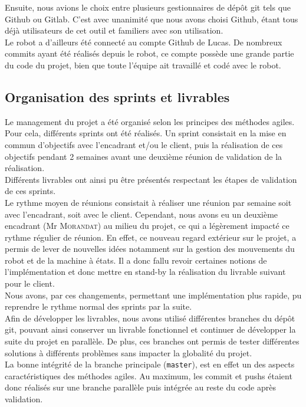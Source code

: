 \documentclass[a4paper,french]{article}
\begin{document}
Ensuite, nous avions le choix entre plusieurs gestionnaires de dépôt git tels que Github ou Gitlab. C'est avec unanimité que nous avons choisi Github, étant tous déjà utilisateurs de cet outil et familiers avec son utilisation. \\

Le robot a d'ailleurs été connecté au compte Github de Lucas. De nombreux commits ayant été réalisés depuis le robot, ce compte possède une grande partie du code du projet, bien que toute l'équipe ait travaillé et codé avec le robot.

\subsection{Organisation des sprints et livrables}
Le management du projet a été organisé selon les principes des méthodes agiles. Pour cela, différents sprints ont été réalisés. Un sprint consistait en la mise en commun d'objectifs avec l'encadrant et/ou le client, puis la réalisation de ces objectifs pendant 2 semaines avant une deuxième réunion de validation de la réalisation. \\
Différents livrables ont ainsi pu être présentés respectant les étapes de validation de ces sprints. \\

Le rythme moyen de réunions consistait à réaliser une réunion par semaine soit avec l'encadrant, soit avec le client. Cependant, nous avons eu un deuxième encadrant (Mr \textsc{Morandat}) au milieu du projet, ce qui a légèrement impacté ce rythme régulier de réunion. En effet, ce nouveau regard extérieur sur le projet, a permis de lever de nouvelles idées notamment sur la gestion des mouvements du robot et de la machine à états. Il a donc fallu revoir certaines notions de l'implémentation et donc mettre en stand-by la réalisation du livrable suivant pour le client. \\

Nous avons, par ces changements, permettant une implémentation plus rapide, pu reprendre le rythme normal des sprints par la suite. \\

Afin de développer les livrables, nous avons utilisé différentes branches du dépôt git, pouvant ainsi conserver un livrable fonctionnel et continuer de développer la suite du projet en parallèle. De plus, ces branches ont permis de tester différentes solutions à différents problèmes sans impacter la globalité du projet. \\ La bonne intégrité de la branche principale (\texttt{master}), est en effet un des aspects caractéristiques des méthodes agiles. Au maximum, les commit et pushs étaient donc réalisés sur une branche parallèle puis intégrée au reste du code après validation.
\end{document}
